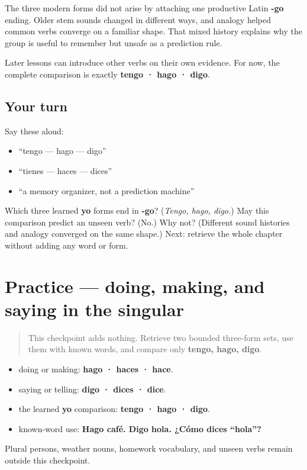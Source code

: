 \begin{cousinweb}
The three modern forms did not arise by attaching one productive Latin \textbf{-go} ending. Older stem sounds changed in different ways, and analogy helped common verbs converge on a familiar shape. That mixed history explains why the group is useful to remember but unsafe as a prediction rule.

Later lessons can introduce other verbs on their own evidence. For now, the complete comparison is exactly \textbf{tengo · hago · digo}.
\end{cousinweb}

\subsection*{Your turn}
Say these aloud:

\begin{itemize}
\raggedright
  \item “tengo — hago — digo”
  \item “tienes — haces — dices”
  \item “a memory organizer, not a prediction machine”
\end{itemize}

\begin{tcolorbox}[breakable,colback=teal!4,colframe=teal!35!black,title={Before you move on}]
Which three learned \textbf{yo} forms end in \textbf{-go}? (\emph{Tengo, hago, digo.}) May this comparison predict an unseen verb? (No.) Why not? (Different sound histories and analogy converged on the same shape.) Next: retrieve the whole chapter without adding any word or form.
\end{tcolorbox}
\section[Practice]{Practice — doing, making, and saying in the singular}

\label{lesson:ES-C12-practice}



\begin{quote}
This checkpoint adds nothing. Retrieve two bounded three-form sets, use them with known words, and compare only \textbf{tengo, hago, digo}.
\end{quote}

\begin{grammarlens}[title={Grammar Lens: the complete small chapter frame}]
\begin{itemize}
\raggedright
  \item doing or making: \textbf{hago · haces · hace}.
  \item saying or telling: \textbf{digo · dices · dice}.
  \item the learned \textbf{yo} comparison: \textbf{tengo · hago · digo}.
  \item known-word use: \textbf{Hago café. Digo hola. ¿Cómo dices “hola”?}
\end{itemize}

Plural persons, weather nouns, homework vocabulary, and unseen verbs remain outside this checkpoint.
\end{grammarlens}

